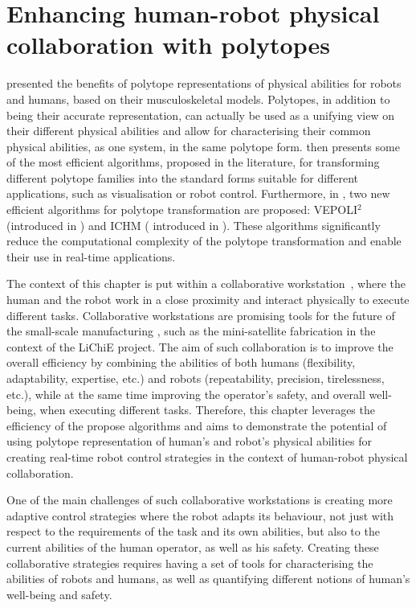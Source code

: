 
\chapter{Enhancing human-robot physical collaboration with polytopes}
\label{ch:physical_interaction}

 presented the benefits of polytope representations of physical abilities for robots and humans, based on their musculoskeletal models. Polytopes, in addition to being their accurate representation, can actually be used as a unifying view on their different physical abilities and allow for characterising their common physical abilities, as one system, in the same polytope form.  then presents some of the most efficient algorithms, proposed in the literature, for transforming different polytope families into the standard forms suitable for different applications, such as visualisation or robot control. Furthermore, in , two new efficient algorithms for polytope transformation are proposed: VEPOLI$^2$ (introduced in ) and ICHM ( introduced in ). These algorithms significantly reduce the computational complexity of the polytope transformation and enable their use in real-time applications.

The context of this chapter is put within a collaborative workstation~\cite{SIMOES2022workplace,Bejarano2019}, where
the human and the robot work in a close proximity and interact physically to execute different tasks. Collaborative workstations are promising tools for the future of the small-scale manufacturing \cite{Giberti2022Methodology,wang2022futuristic}, such as the mini-satellite fabrication in the context of the LiChiE project.  
The aim of such collaboration is to improve the overall efficiency by combining the abilities of both humans (flexibility, adaptability, expertise, etc.) and robots (repeatability, precision, tirelessness, etc.), while at the same time improving the operator's safety, and overall well-being, when executing different tasks. 
Therefore, this chapter leverages the efficiency of the propose algorithms and aims to demonstrate the potential of using polytope representation of human's and robot's physical abilities for creating real-time robot control strategies in the context of human-robot physical collaboration.  

One of the main challenges of such collaborative workstations is creating more adaptive control strategies where the robot adapts its behaviour, not just with respect to the requirements of the task and its own abilities, but also to the current abilities of the human operator, as well as his safety. Creating these collaborative strategies requires having a set of tools for characterising the abilities of robots and humans, as well as quantifying different notions of human's well-being and safety. 


